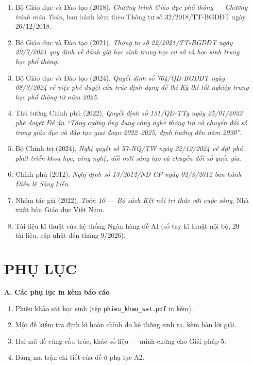 \begin{enumerate}[leftmargin=1.2cm, itemsep=3pt]
  \item Bộ Giáo dục và Đào tạo (2018), \textit{Chương trình Giáo dục phổ thông
        --- Chương trình môn Toán}, ban hành kèm theo Thông tư số
        32/2018/TT-BGDĐT ngày 26/12/2018.
  \item Bộ Giáo dục và Đào tạo (2021), \textit{Thông tư số 22/2021/TT-BGDĐT
        ngày 20/7/2021 quy định về đánh giá học sinh trung học cơ sở và học
        sinh trung học phổ thông}.
  \item Bộ Giáo dục và Đào tạo (2024), \textit{Quyết định số 764/QĐ-BGDĐT ngày
        08/3/2024 về việc phê duyệt cấu trúc định dạng đề thi Kỳ thi tốt nghiệp
        trung học phổ thông từ năm 2025}.
  \item Thủ tướng Chính phủ (2022), \textit{Quyết định số 131/QĐ-TTg ngày
        25/01/2022 phê duyệt Đề án ``Tăng cường ứng dụng công nghệ thông tin và
        chuyển đổi số trong giáo dục và đào tạo giai đoạn 2022--2025, định
        hướng đến năm 2030''}.
  \item Bộ Chính trị (2024), \textit{Nghị quyết số 57-NQ/TW ngày 22/12/2024 về
        đột phá phát triển khoa học, công nghệ, đổi mới sáng tạo và chuyển đổi
        số quốc gia}.
  \item Chính phủ (2012), \textit{Nghị định số 13/2012/NĐ-CP ngày 02/3/2012 ban
        hành Điều lệ Sáng kiến}.
  \item Nhóm tác giả (2022), \textit{Toán 10 --- Bộ sách Kết nối tri thức với
        cuộc sống}, Nhà xuất bản Giáo dục Việt Nam.
  \item Tài liệu kĩ thuật của hệ thống Ngân hàng đề AI (sổ tay kĩ thuật nội bộ,
        20 tài liệu, cập nhật đến tháng 9/2026).
\end{enumerate}


\clearpage

\section*{PHỤ LỤC}

\textbf{A. Các phụ lục in kèm báo cáo}

\begin{enumerate}[label=\textbf{A\arabic*.}, leftmargin=1.4cm, itemsep=4pt]
  \item Phiếu khảo sát học sinh (tệp \texttt{phieu\_khao\_sat.pdf} in kèm).
  \item Một đề kiểm tra định kì hoàn chỉnh do hệ thống sinh ra, kèm bản lời giải.
  \item Hai mã đề cùng cấu trúc, khác số liệu --- minh chứng cho Giải pháp 5.
  \item Bảng ma trận chi tiết của đề ở phụ lục A2.
\end{enumerate}

